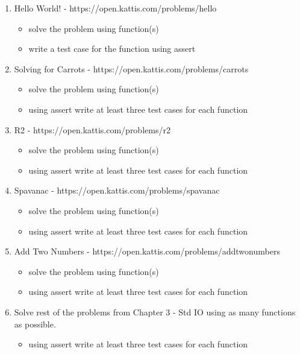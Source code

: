 \documentclass[11pt]{article}
\providecommand{\tightlist}{%
      \setlength{\itemsep}{0pt}\setlength{\parskip}{0pt}}
\begin{document}
\begin{enumerate}
\def\labelenumi{\arabic{enumi}.}
\tightlist
\item
  Hello World! - https://open.kattis.com/problems/hello

  \begin{itemize}
  \tightlist
  \item
    solve the problem using function(s)
  \item
    write a test case for the function using assert
  \end{itemize}
\item
  Solving for Carrots - https://open.kattis.com/problems/carrots

  \begin{itemize}
  \tightlist
  \item
    solve the problem using function(s)
  \item
    using assert write at least three test cases for each function
  \end{itemize}
\item
  R2 - https://open.kattis.com/problems/r2

  \begin{itemize}
  \tightlist
  \item
    solve the problem using function(s)
  \item
    using assert write at least three test cases for each function
  \end{itemize}
\item
  Spavanac - https://open.kattis.com/problems/spavanac

  \begin{itemize}
  \tightlist
  \item
    solve the problem using function(s)
  \item
    using assert write at least three test cases for each function
  \end{itemize}
\item
  Add Two Numbers - https://open.kattis.com/problems/addtwonumbers

  \begin{itemize}
  \tightlist
  \item
    solve the problem using function(s)
  \item
    using assert write at least three test cases for each function
  \end{itemize}
\item
  Solve rest of the problems from Chapter 3 - Std IO using as many
  functions as possible.

  \begin{itemize}
  \tightlist
  \item
    using assert write at least three test cases for each function
  \end{itemize}
\end{enumerate}
\end{document}
